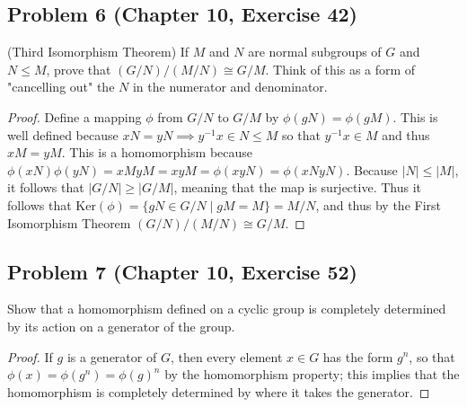 \documentclass{article}
\begin{document}
\subsection*{Problem 6 (Chapter 10, Exercise 42)}
(Third Isomorphism Theorem) If $M$ and $N$ are normal subgroups of $G$ and $N \leq M$, prove that $(G/N)/(M/N) \cong G/M$. Think of this as a form of "cancelling out" the $N$ in the numerator and denominator.
\begin{proof}
Define a mapping $\phi$ from $G/N$ to $G/M$ by $\phi(gN) = \phi(gM)$. This is well defined because $xN = yN \implies y^{-1}x \in N \leq M$ so that $y^{-1}x \in M$ and thus $xM = yM$. This is a homomorphism because $\phi(xN)\phi(yN) = xMyM = xyM = \phi(xyN) = \phi(xNyN)$. Because $|N| \leq |M|$, it follows that $|G/N| \geq |G/M|$, meaning that the map is surjective. Thus it follows that $\text{Ker}(\phi) = \{gN \in G/N \mid gM = M\} = M/N$, and thus by the First Isomorphism Theorem $(G/N)/(M/N) \cong G/M$.
\end{proof}

\subsection*{Problem 7 (Chapter 10, Exercise 52)}
Show that a homomorphism defined on a cyclic group is completely determined by its action on a generator of the group.
\begin{proof}
If $g$ is a generator of $G$, then every element $x \in G$ has the form $g^n$, so that $\phi(x) = \phi(g^n) = \phi(g)^n$ by the homomorphism property; this implies that the homomorphism is completely determined by where it takes the generator.
\end{proof}
\end{document}
